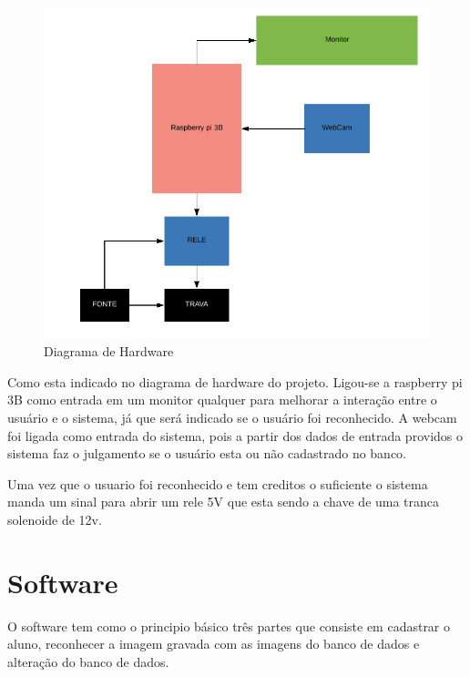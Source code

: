 \documentclass[conference,compsoc]{IEEEtran}
\begin{document}
 \begin{figure}[!ht]
		\centering
		\includegraphics[scale=0.25]{diagrama_de_hardware.png}
		\caption{Diagrama de Hardware}
\end{figure}

Como esta indicado no diagrama de hardware do projeto. Ligou-se a raspberry pi 3B como entrada em um monitor qualquer para melhorar a interação entre o usuário e o sistema, já que será indicado se o usuário foi reconhecido. A webcam foi ligada como entrada do sistema, pois a partir dos dados de entrada providos o sistema faz o julgamento se o usuário esta ou não cadastrado no banco.
	
	Uma vez que o usuario foi reconhecido e tem creditos o suficiente o sistema manda um sinal para abrir um rele 5V que esta sendo a chave de uma tranca solenoide de 12v. 




 \section{Software}

O software tem como o principio básico três partes que consiste em cadastrar o aluno, reconhecer a imagem gravada com as imagens do banco de dados e alteração do banco de dados.
\end{document}
